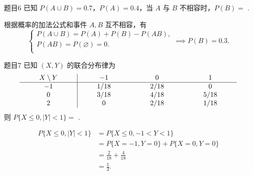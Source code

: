 \documentclass{article}
\begin{document}
\begin{question}{题目6}
    已知 $P(A \cup B) = 0.7$，$P(A) = 0.4$，当 $A$ 与 $B$ 不相容时，$P(B) = $ \underline{\hspace{2cm}}.
\end{question}
\begin{solution}
    根据概率的加法公式和事件 $A,B$ 互不相容，有
    $$
        \begin{cases}
            P(A \cup B)  = P(A) + P(B) - P(AB), \\
            P(AB) = P(\varnothing) = 0.         \\
        \end{cases}
        \implies
        P(B) = 0.3.
    $$
\end{solution}

\begin{question}{题目7}
    已知 $(X,Y)$ 的联合分布律为
    $$
        \setlength{\arraycolsep}{10mm}
        \begin{array}{c|ccccc}
            X \setminus Y & -1   & 0    & 1    \\
            \hline
            -1            & 1/18 & 2/18 & 0    \\
            0             & 3/18 & 4/18 & 5/18 \\
            2             & 0    & 2/18 & 1/18 \\
        \end{array}
    $$
    则 $P\{X \leqslant 0 , |Y|<1\} = $ \underline{\hspace{2cm}}.
\end{question}
\begin{solution}
    $$
        \begin{aligned}
            P\{X \leqslant 0 , |Y|<1\}
             & = P\{X \leqslant 0 , -1<Y<1\}    \\
             & = P\{X=-1, Y=0\} + P\{X=0, Y=0\} \\
             & = \frac{2}{18} + \frac{4}{18}    \\
             & = \frac{1}{3}.                   \\
        \end{aligned}
    $$
\end{solution}
\end{document}
